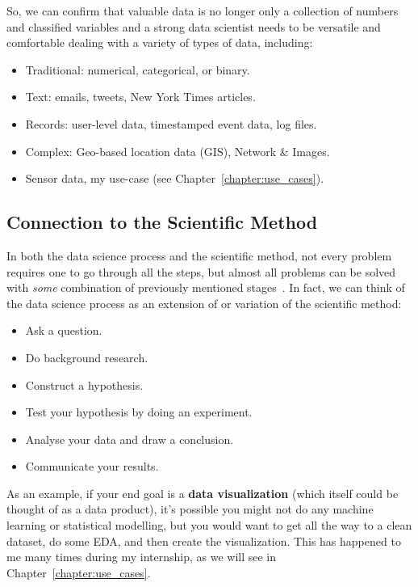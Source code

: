 So, we can confirm that valuable data is no longer only a collection of numbers and classified variables and
a strong data scientist needs to be versatile and comfortable dealing with a variety of types of data, including:
\begin{itemize}
    \item Traditional: numerical, categorical, or binary.
    \item Text: emails, tweets, New York Times articles.
    \item Records: user-level data, timestamped event data, log files.
    \item Complex: Geo-based location data (GIS), Network \& Images.
    \item Sensor data, my use-case (see Chapter~\ref{chapter:use_cases}).
\end{itemize}

\subsection{Connection to the Scientific Method}
In both the data science process and the scientific method, not every problem requires one to go through all the steps, but almost all problems can be solved with \textit{some} combination of previously mentioned stages~\cite{Book:doing_data_science}.
In fact, we can think of the data science process as an extension of or variation of the scientific method:
\begin{itemize}
    \item Ask a question.
    \item Do background research.
    \item Construct a hypothesis.
    \item Test your hypothesis by doing an experiment.
    \item Analyse your data and draw a conclusion.
    \item Communicate your results.
\end{itemize}
As an example, if your end goal is a \textbf{data visualization} (which itself could be thought of as a data product), it's possible you might not do any machine learning or statistical modelling,
but you would want to get all the way to a clean dataset, do some \acl{EDA}, and then create the visualization. This has happened to me many times during my internship, as we will see in Chapter~\ref{chapter:use_cases}.

